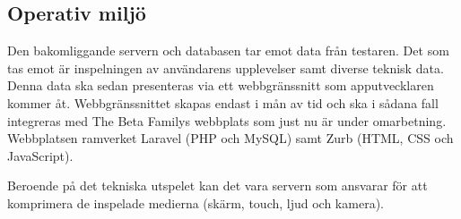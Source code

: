 \subsection{Operativ miljö}
Den bakomliggande servern och databasen tar emot data från testaren. Det som tas emot är inspelningen av användarens upplevelser samt diverse teknisk data. Denna data ska sedan presenteras via ett webbgränssnitt som apputvecklaren kommer åt. Webbgränssnittet skapas endast i mån av tid och ska i sådana fall integreras med The Beta Familys webbplats som just nu är under omarbetning. Webbplatsen ramverket Laravel (PHP och MySQL) samt Zurb (HTML, CSS och JavaScript).

Beroende på det tekniska utspelet kan det vara servern som ansvarar för att komprimera de inspelade medierna (skärm, touch, ljud och kamera).
